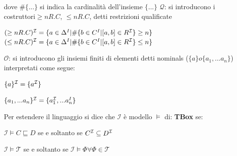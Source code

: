 \documentclass[a4paper,11pt]{article}
\newcommand{\I}{%
        \ensuremath{\mathcal{I}}\xspace}
\newcommand{\Q}{%
  \ensuremath{\mathcal{Q}}\xspace}
\newcommand{\Onom}{%
  \ensuremath{\mathcal{O}}\xspace}
\newcommand{\T}{%
  \ensuremath{\mathcal{T}}\xspace}
\begin{document}
\begin{enumerate}
\begin{enumerate}[label*=\arabic*.]
dove $\#\{...\}$ si indica la cardinalità dell'insieme $\{...\}$\newline 
$\Q$: si introducono i costruttori$\geq nR.C$, $\leq nR.C$, detti restrizioni qualificate\newline
\begin{center}
		$(\geq nR.C)^{\I}=\{a \in \Delta^{I}|\#\{b \in C^{I} |[a,b] \in R^{\I}\}\geq n\}$\newline$(\leq nR.C)^{\I}=\{a \in \Delta^{I}|\#\{b \in C^{I} |[a,b] \in R^{\I}\}\leq n\}$\newline
\end{center}
$\Onom$: si introducono gli insiemi finiti di elementi detti nominals ($\{a\} o \{a_1,...a_n\} $) interpretati come segue:
\begin{center}
$\{a\}^{\I}=\{a^{\I}\}$
\end{center}
\begin{center}
$\{a_1,...a_n\}^{\I}=\{a_1^{\I},...a_n^{I}\}$
\end{center}\newpage
Per estendere il linguaggio si dice che $\I$ è modello $\models$ di:\newline
\textbf{TBox} se:
\begin{center}
	$\I \models C \sqsubseteq D$ se e soltanto se $C^{\I} \subseteq D^{\I}$	
\end{center}
\begin{center}
	$\I \models \T$ se e soltanto se $\I \models \Phi \forall \Phi \in \T $
\end{center}


\end{enumerate}
\end{enumerate}
\end{document}
